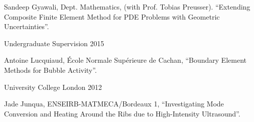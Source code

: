 \documentclass[11pt, a4paper]{awesome-cv}
\begin{document}
\begin{cventries}
{\begin{cvitems}
\item Sandeep Gyawali, Dept. Mathematics, (with Prof. Tobias Preusser). %
\enquote{Extending Composite Finite Element Method for PDE Problems with Geometric Uncertainties}.
\end{cvitems}}
%
%
{Undergraduate Supervision}%
{}%
{2015}%
{\begin{cvitems}%
\item Antoine Lucquiaud, \'{E}cole Normale Sup\'{e}rieure de Cachan, \enquote{Boundary Element Methods for Bubble Activity}.%
\end{cvitems}}%
{University College London}%
{}%
{2012}%
{\begin{cvitems}%
\item Jade Junqua, ENSEIRB-MATMECA/Bordeaux 1, \enquote{Investigating Mode Conversion and Heating Around the Ribs due to High-Intensity Ultrasound}.
\end{cvitems}}%
%
%
%
%
%
\end{cventries}
\end{document}
